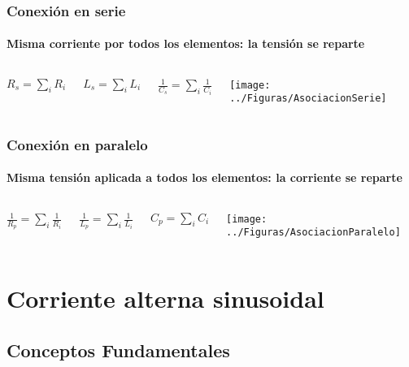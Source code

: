 \documentclass[serif, xcolor=dvipsnames]{beamer}
\begin{document}
\begin{frame}
  \frametitle{Conexión en serie }


  \framesubtitle{Misma corriente por todos los elementos: la tensión
    se reparte}
  \begin{columns}[c]%


    \column{3cm}


    $R_{s}=\sum_{i}R_{i}$


    $L_{s}=\sum_{i}L_{i}$


    $\frac{1}{C_{s}}=\sum_{i}\frac{1}{C_{i}}$


    \column{5cm}


    \begin{center}
      \texttt{[image: ../Figuras/AsociacionSerie]}
      \par\end{center}

  \end{columns}%

\end{frame}
\begin{frame}
  \frametitle{Conexión en paralelo}


  \framesubtitle{Misma tensión aplicada a todos los elementos: la
    corriente se reparte}
  \begin{columns}[c]%


    \column{3cm}


    $\frac{1}{R_{p}}=\sum_{i}\frac{1}{R_{i}}$


    $\frac{1}{L_{p}}=\sum_{i}\frac{1}{L_{i}}$


    $C_{p}=\sum_{i}C_{i}$


    \column{5cm}


    \begin{center}
      \texttt{[image: ../Figuras/AsociacionParalelo]}
      \par\end{center}

  \end{columns}%

\end{frame}



\section{Corriente alterna sinusoidal}


\subsection{Conceptos Fundamentales}
\end{document}
